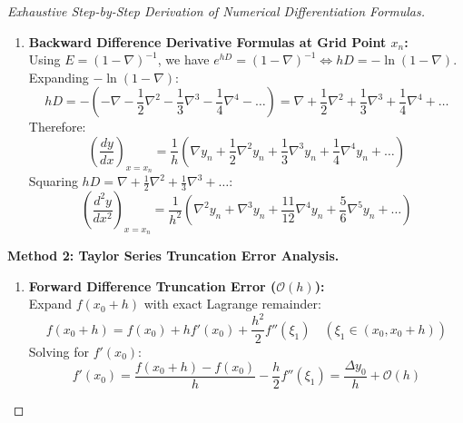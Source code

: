 \begin{proof}[Exhaustive Step-by-Step Derivation of Numerical Differentiation Formulas]
\begin{enumerate}
    \item \textbf{Backward Difference Derivative Formulas at Grid Point $x_n$:} \\
    Using $E = (1 - \nabla)^{-1}$, we have $e^{h D} = (1 - \nabla)^{-1} \iff h D = -\ln(1 - \nabla)$.
    Expanding $-\ln(1 - \nabla)$:
    \begin{equation}
        h D = -\left( -\nabla - \frac{1}{2}\nabla^2 - \frac{1}{3}\nabla^3 - \frac{1}{4}\nabla^4 - \dots \right) = \nabla + \frac{1}{2}\nabla^2 + \frac{1}{3}\nabla^3 + \frac{1}{4}\nabla^4 + \dots
    \end{equation}
    Therefore:
    \begin{equation}
        \boxed{\left(\frac{dy}{dx}\right)_{x=x_n} = \frac{1}{h}\left( \nabla y_n + \frac{1}{2}\nabla^2 y_n + \frac{1}{3}\nabla^3 y_n + \frac{1}{4}\nabla^4 y_n + \dots \right)}
    \end{equation}
    Squaring $h D = \nabla + \frac{1}{2}\nabla^2 + \frac{1}{3}\nabla^3 + \dots$:
    \begin{equation}
        \boxed{\left(\frac{d^2 y}{dx^2}\right)_{x=x_n} = \frac{1}{h^2}\left( \nabla^2 y_n + \nabla^3 y_n + \frac{11}{12}\nabla^4 y_n + \frac{5}{6}\nabla^5 y_n + \dots \right)}
    \end{equation}
\end{enumerate}

\medskip
\noindent\textbf{Method 2: Taylor Series Truncation Error Analysis.} \\
\begin{enumerate}
    \item \textbf{Forward Difference Truncation Error ($\mathcal{O}(h)$):} \\
    Expand $f(x_0 + h)$ with exact Lagrange remainder:
    \begin{equation}
        f(x_0 + h) = f(x_0) + h f'(x_0) + \frac{h^2}{2} f''(\xi_1) \quad (\xi_1 \in (x_0, x_0 + h))
    \end{equation}
    Solving for $f'(x_0)$:
    \begin{equation}
        f'(x_0) = \frac{f(x_0 + h) - f(x_0)}{h} - \frac{h}{2} f''(\xi_1) = \frac{\Delta y_0}{h} + \mathcal{O}(h)
    \end{equation}
    

\end{enumerate}
\end{proof}
